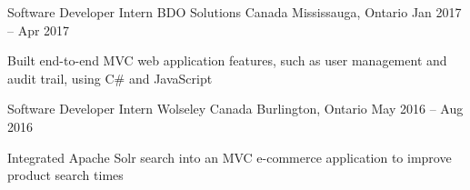 \begin{cventries}
  \cventry
    {Software Developer Intern} %
    {BDO Solutions Canada} %
    {Mississauga, Ontario} %
    {Jan 2017 -- Apr 2017} %
    {
      \begin{cvitems} %
        \item {Built end-to-end MVC web application features, such as user management and audit trail, using C\# and JavaScript}
      \end{cvitems}
    }

  \cventry
    {Software Developer Intern} %
    {Wolseley Canada} %
    {Burlington, Ontario} %
    {May 2016 -- Aug 2016} %
    {
      \begin{cvitems} %
        \item {Integrated Apache Solr search into an MVC e-commerce application to improve product search times}
      \end{cvitems}
    }

\end{cventries}
